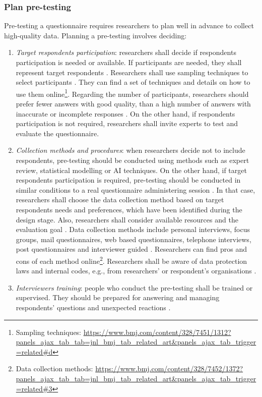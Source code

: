 \subsubsection{Plan pre-testing}
Pre-testing a questionnaire requires researchers to plan well in advance to collect high-quality data. Planning a pre-testing involves deciding:

\begin{enumerate}
    \item \emph{Target respondents participation}: researchers shall decide if respondents participation is needed or available. If participants are needed, they shall represent target respondents \autocite{Krosnick2009,Boynton2004}.
    Researchers shall use sampling techniques to select participants \autocite{Boynton2004c,Diem,Radhakrishna2007}. They can find a set of techniques and details on how to use them online\footnote{Sampling techniques: \url{https://www.bmj.com/content/328/7451/1312?panels_ajax_tab_tab=jnl_bmj_tab_related_art&panels_ajax_tab_trigger=related\#d}}.
    Regarding the number of participants, researchers should prefer fewer answers with good quality, than a high number of answers with inaccurate or incomplete responses \autocite{Boynton2004}. On the other hand, if respondents participation is not required, researchers shall invite experts to test and evaluate the questionnaire.
    
    \item \emph{Collection methods and procedures}: when researchers decide not to include respondents, pre-testing should be conducted using methods such as expert review, statistical modelling or \ac{AI} techniques. On the other hand, if target respondents participation is required, pre-testing should be conducted in similar conditions to a real questionnaire administering session \autocite{Krosnick2009}. In that case, researchers shall choose the data collection method based on target respondents needs and preferences, which have been identified during the design stage. Also, researchers shall consider available resources and the evaluation goal \autocite{Boynton2004}.
    Data collection methods include personal interviews, focus groups, mail questionnaires, web based questionnaires, telephone interviews, post questionnaires and interviewer guided \autocite{Crawford1997,Diem,Boynton2004}. Researchers can find pros and cons of each method online\footnote{Data collection methods: \url{https://www.bmj.com/content/328/7452/1372?panels_ajax_tab_tab=jnl_bmj_tab_related_art&panels_ajax_tab_trigger=related\#3}}.
    Researchers shall be aware of data protection laws and internal codes, e.g., from researchers' or respondent's organisations \autocite{Boynton2004}.
    
    \item \emph{Interviewers training}: people who conduct the pre-testing shall be trained or supervised. They should be prepared for answering and managing respondents' questions and unexpected reactions \autocite{Boynton2004b}.
\end{enumerate}


